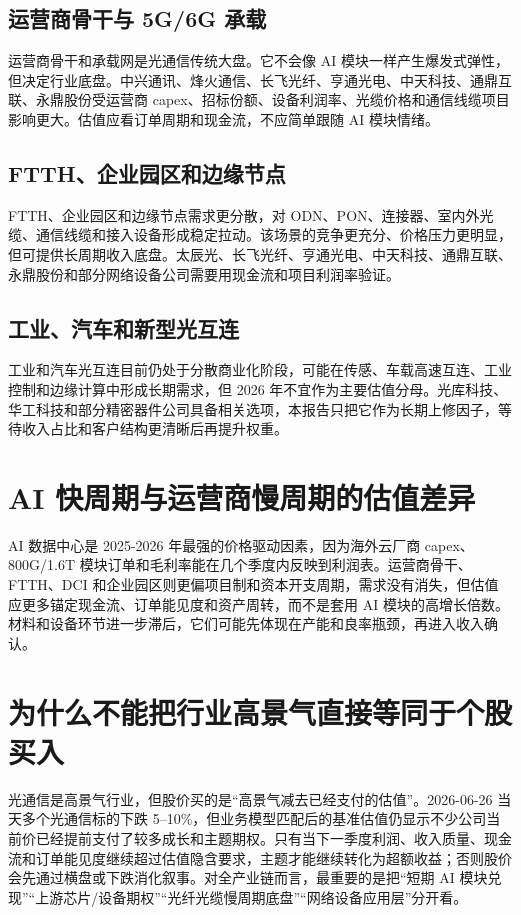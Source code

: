 \subsection{运营商骨干与 5G/6G 承载}
运营商骨干和承载网是光通信传统大盘。它不会像 AI 模块一样产生爆发式弹性，但决定行业底盘。中兴通讯、烽火通信、长飞光纤、亨通光电、中天科技、通鼎互联、永鼎股份受运营商 capex、招标份额、设备利润率、光缆价格和通信线缆项目影响更大。估值应看订单周期和现金流，不应简单跟随 AI 模块情绪。
\subsection{FTTH、企业园区和边缘节点}
FTTH、企业园区和边缘节点需求更分散，对 ODN、PON、连接器、室内外光缆、通信线缆和接入设备形成稳定拉动。该场景的竞争更充分、价格压力更明显，但可提供长周期收入底盘。太辰光、长飞光纤、亨通光电、中天科技、通鼎互联、永鼎股份和部分网络设备公司需要用现金流和项目利润率验证。
\subsection{工业、汽车和新型光互连}
工业和汽车光互连目前仍处于分散商业化阶段，可能在传感、车载高速互连、工业控制和边缘计算中形成长期需求，但 2026 年不宜作为主要估值分母。光库科技、华工科技和部分精密器件公司具备相关选项，本报告只把它作为长期上修因子，等待收入占比和客户结构更清晰后再提升权重。

\section{AI 快周期与运营商慢周期的估值差异}
AI 数据中心是 2025-2026 年最强的价格驱动因素，因为海外云厂商 capex、800G/1.6T 模块订单和毛利率能在几个季度内反映到利润表。运营商骨干、FTTH、DCI 和企业园区则更偏项目制和资本开支周期，需求没有消失，但估值应更多锚定现金流、订单能见度和资产周转，而不是套用 AI 模块的高增长倍数。材料和设备环节进一步滞后，它们可能先体现在产能和良率瓶颈，再进入收入确认。

\section{为什么不能把行业高景气直接等同于个股买入}
光通信是高景气行业，但股价买的是“高景气减去已经支付的估值”。2026-06-26 当天多个光通信标的下跌 5--10\%，但业务模型匹配后的基准估值仍显示不少公司当前价已经提前支付了较多成长和主题期权。只有当下一季度利润、收入质量、现金流和订单能见度继续超过估值隐含要求，主题才能继续转化为超额收益；否则股价会先通过横盘或下跌消化叙事。对全产业链而言，最重要的是把“短期 AI 模块兑现”“上游芯片/设备期权”“光纤光缆慢周期底盘”“网络设备应用层”分开看。

